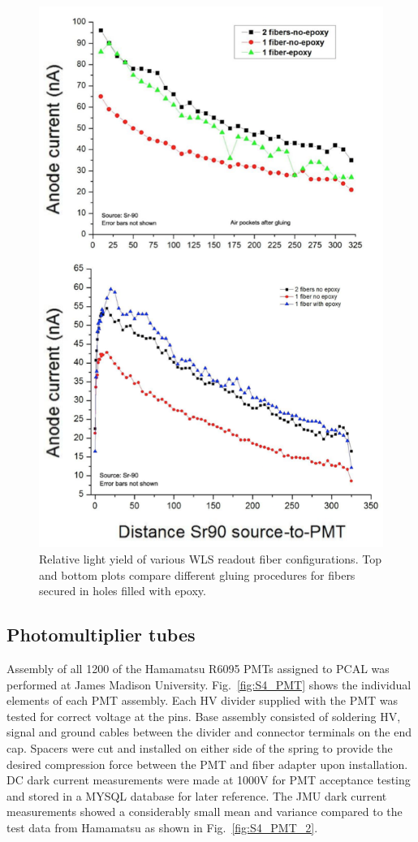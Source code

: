 \begin{figure}[hbt]
\centering
\includegraphics[width=0.85\columnwidth,keepaspectratio]{img/S4_4.png}
\caption{Relative light yield of various WLS readout fiber configurations.  Top and bottom plots compare different gluing procedures for fibers secured in holes filled with epoxy.}
\label{fig:S4_4}
\end{figure}

\subsection{Photomultiplier tubes}
Assembly of all 1200 of the Hamamatsu R6095 PMTs assigned to PCAL was performed at James Madison University. Fig.~\ref{fig:S4_PMT} shows the individual elements of each PMT assembly. Each HV divider supplied with the PMT was tested for correct voltage at the pins.   Base assembly consisted of soldering HV, signal and ground cables between the divider and connector terminals on the end cap.  Spacers were cut and installed on either side of the spring to provide the desired compression force between the PMT and fiber adapter upon installation.  DC dark current measurements were made at 1000V for PMT acceptance testing and stored in a MYSQL database for later reference.  The  JMU dark current measurements showed a considerably small mean and variance compared to the test data from Hamamatsu as shown in Fig.~\ref{fig:S4_PMT_2}. 

